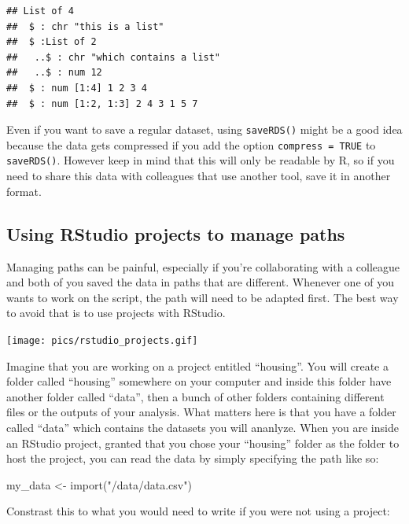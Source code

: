 \documentclass[
]{article}
\newenvironment{Shaded}{\begin{snugshade}}{\end{snugshade}}
\newcommand{\FunctionTok}[1]{\textcolor[rgb]{0.00,0.00,0.00}{#1}}
\newcommand{\NormalTok}[1]{#1}
\newcommand{\OtherTok}[1]{\textcolor[rgb]{0.56,0.35,0.01}{#1}}
\newcommand{\StringTok}[1]{\textcolor[rgb]{0.31,0.60,0.02}{#1}}
\begin{document}
\begin{verbatim}
## List of 4
##  $ : chr "this is a list"
##  $ :List of 2
##   ..$ : chr "which contains a list"
##   ..$ : num 12
##  $ : num [1:4] 1 2 3 4
##  $ : num [1:2, 1:3] 2 4 3 1 5 7
\end{verbatim}

Even if you want to save a regular dataset, using \texttt{saveRDS()} might be a good idea because the data
gets compressed if you add the option \texttt{compress\ =\ TRUE} to \texttt{saveRDS()}. However keep in mind that
this will only be readable by R, so if you need to share this data with colleagues that use another
tool, save it in another format.

\hypertarget{using-rstudio-projects-to-manage-paths}{%
\subsection{Using RStudio projects to manage paths}\label{using-rstudio-projects-to-manage-paths}}

Managing paths can be painful, especially if you're collaborating with a colleague and both of you
saved the data in paths that are different. Whenever one of you wants to work on the script, the
path will need to be adapted first. The best way to avoid that is to use projects with RStudio.

\texttt{[image: pics/rstudio\_projects.gif]}

Imagine that you are working on a project entitled ``housing''. You will create a folder called
``housing'' somewhere on your computer and inside this folder have another folder called ``data'', then
a bunch of other folders containing different files or the outputs of your analysis. What matters
here is that you have a folder called ``data'' which contains the datasets you will ananlyze. When
you are inside an RStudio project, granted that you chose your ``housing'' folder as the folder to
host the project, you can read the data by simply specifying the path like so:

\begin{Shaded}
\begin{Highlighting}[]
\NormalTok{my\_data }\OtherTok{\textless{}{-}} \FunctionTok{import}\NormalTok{(}\StringTok{"/data/data.csv"}\NormalTok{)}
\end{Highlighting}
\end{Shaded}

Constrast this to what you would need to write if you were not using a project:
\end{document}
